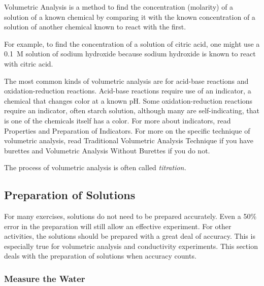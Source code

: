 Volumetric Analysis is a method to find the concentration (molarity) of a solution of a known chemical by comparing it with the known concentration of a solution of another chemical known to react with the first.

For example, to find the concentration of a solution of citric acid, one might use a 0.1~M solution of sodium hydroxide because sodium hydroxide is known to react with citric acid.

The most common kinds of volumetric analysis are for acid-base reactions and oxidation-reduction reactions. Acid-base reactions require use of an indicator, a chemical that changes color at a known pH. Some oxidation-reduction reactions require an indicator, often starch solution, although many are self-indicating, that is one of the chemicals itself has a color. For more about indicators, read Properties and Preparation of Indicators. For more on the specific technique of volumetric analysis, read Traditional Volumetric Analysis Technique if you have burettes and Volumetric Analysis Without Burettes if you do not.

The process of volumetric analysis is often called \textit{titration.}


\subsection{Preparation of Solutions}

For many exercises, solutions do not need to be prepared accurately. Even a 50\% error in the preparation will still allow an effective experiment. For other activities, the solutions should be prepared with a great deal of accuracy. This is especially true for volumetric analysis and conductivity experiments. This section deals with the preparation of solutions when accuracy counts.

\subsubsection{Measure the Water}

